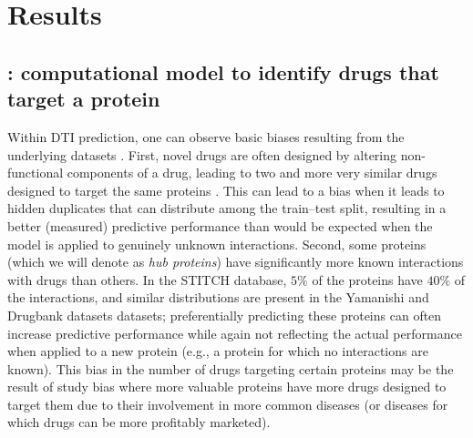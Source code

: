 \documentclass{bioinfo}
\renewcommand{\cite}{\citep}
\begin{document}
\section{Results}

\subsection{\name: computational model to identify drugs that target a
	protein}


Within DTI prediction, one can observe basic biases resulting from the
underlying datasets \citep{Pahikkala2014}. First, novel drugs are
often designed by altering non-functional components of a drug,
leading to two and more very similar drugs designed to target the same
proteins \cite{Overington2006}. This can lead to a bias when it leads
to \glqq hidden duplicates\grqq{} that can distribute among the
train--test split, resulting in a better (measured) predictive
performance than would be expected when the model is applied to
genuinely unknown interactions. Second, some proteins (which we will
denote as \textit{hub proteins}) have significantly more known
interactions with drugs than others. In the STITCH database, $5\%$
of the proteins have $40\%$ of the interactions, and similar
distributions are present in the Yamanishi and Drugbank datasets
\cite{Drugbank2007, Drugbank2017} datasets; preferentially predicting
these proteins can often increase predictive performance while again
not reflecting the actual performance when applied to a new protein
(e.g., a protein for which no interactions are known). This bias in
the number of drugs targeting certain proteins may be the result of
study bias where more \glqq valuable\grqq{} proteins have more drugs
designed to target them due to their involvement in more common
diseases (or diseases for which drugs can be more profitably
marketed).
\end{document}
